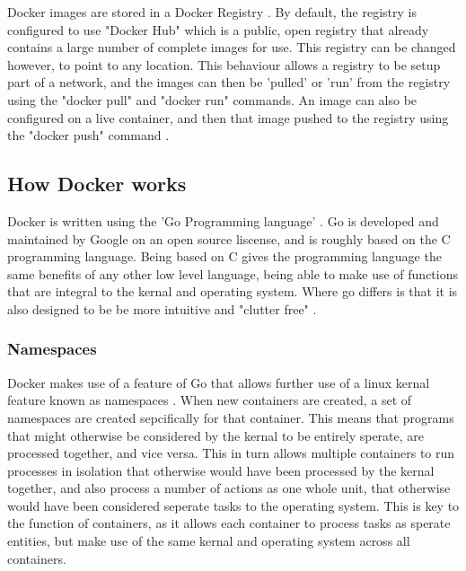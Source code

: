 Docker images are stored in a Docker Registry \citep[Section: Docker registries]{DockerOverview}. By default, the registry is configured to use "Docker Hub" which is a public, open registry that already contains a large number of complete images for use. This registry can be changed however, to point to any location. This behaviour allows a registry to be setup part of a network, and the images can then be 'pulled' or 'run' from the registry using the "docker pull" and "docker run" commands\citep[Section: Docker registries]{DockerOverview}. An image can also be configured on a live container, and then that image pushed to the registry using the "docker push" command \citep[Section: Docker registries]{DockerOverview}.

\subsection{How Docker works}
Docker is written using the 'Go Programming language' \citep[Section: The underlying technology]{DockerOverview}. Go is developed and maintained by Google on an open source liscense, and is roughly based on the C programming language\citep{GoAncestors}. Being based on C gives the programming language the same benefits of any other low level language, being able to make use of functions that are integral to the kernal and operating system. Where go differs is that it is also designed to be be more intuitive and "clutter free" \citep{GoPrinciples}.

\subsubsection{Namespaces}
Docker makes use of a feature of Go that allows further use of a linux kernal feature known as namespaces \citep[Section: Namespaces]{DockerOverview}.
When new containers are created, a set of namespaces are created sepcifically for that container. This means that programs that might otherwise be considered by the kernal to be entirely sperate, are processed together, and vice versa. This in turn allows multiple containers to run processes in isolation that otherwise would have been processed by the kernal together, and also process a number of actions as one whole unit, that otherwise would have been considered seperate tasks to the operating system. This is key to the function of containers, as it allows each container to process tasks as sperate entities, but make use of the same kernal and operating system across all containers.

